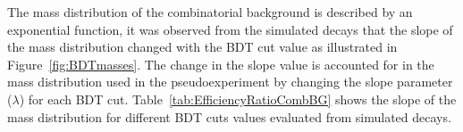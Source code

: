 



The mass distribution of the combinatorial background is described by an exponential function, it was observed from the simulated \bbbarmumux decays that the slope of the mass distribution changed with the BDT cut value as illustrated in Figure~\ref{fig:BDTmasses}. The change in the slope value is accounted for in the mass distribution used in the pseudoexperiment by changing the slope parameter ($\lambda$) for each BDT cut. Table~\ref{tab:EfficiencyRatioCombBG} shows the slope of the mass distribution for different BDT cuts values evaluated from \bbbarmumux simulated decays.

